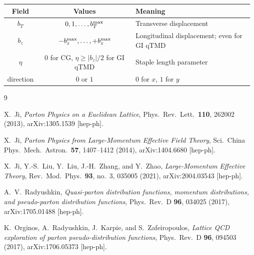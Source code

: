 \documentclass[11pt,a4paper]{article}
\begin{document}
\begin{center}
\begin{tabular}{c|c|l}
\hline
\textbf{Field} & \textbf{Values} & \textbf{Meaning} \\ \hline
$b_T$      & $0,1,\dots,b_T^{\rm max}$ & Transverse displacement \\
$b_z$      & $-b_z^{\rm max},\dots,+b_z^{\rm max}$ & Longitudinal displacement; even for GI qTMD \\
$\eta$      & $0$ for CG, $\eta \ge |b_z|/2$ for GI qTMD & Staple length parameter \\
direction  & $0$ or $1$ & $0$ for $x$, $1$ for $y$ \\
\hline
\end{tabular}
\end{center}

\begin{thebibliography}{9}

X.~Ji,
\emph{Parton Physics on a Euclidean Lattice},
Phys.\ Rev.\ Lett.\ \textbf{110}, 262002 (2013),
arXiv:1305.1539 [hep-ph].

X.~Ji,
\emph{Parton Physics from Large-Momentum Effective Field Theory},
Sci.\ China Phys.\ Mech.\ Astron.\ \textbf{57}, 1407--1412 (2014),
arXiv:1404.6680 [hep-ph].

X.~Ji, Y.-S.~Liu, Y.~Liu, J.-H.~Zhang, and Y.~Zhao,
\emph{Large-Momentum Effective Theory},
Rev.\ Mod.\ Phys.\ \textbf{93}, no.~3, 035005 (2021),
arXiv:2004.03543 [hep-ph].

A.~V.~Radyushkin,
\emph{Quasi-parton distribution functions, momentum distributions, and
pseudo-parton distribution functions},
Phys.\ Rev.\ D \textbf{96}, 034025 (2017),
arXiv:1705.01488 [hep-ph].

K.~Orginos, A.~Radyushkin, J.~Karpie, and S.~Zafeiropoulos,
\emph{Lattice QCD exploration of parton pseudo-distribution functions},
Phys.\ Rev.\ D \textbf{96}, 094503 (2017),
arXiv:1706.05373 [hep-ph].

\end{thebibliography}
\end{document}
